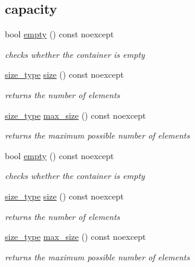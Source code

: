 \subsection*{capacity}
\begin{DoxyCompactItemize}
\item 
bool \hyperlink{classnlohmann_1_1basic__json_ae3fe0423252e171973cdd5786d036e30}{empty} () const noexcept
\begin{DoxyCompactList}\small\item\em checks whether the container is empty \end{DoxyCompactList}\item 
\hyperlink{classnlohmann_1_1basic__json_a1579a8f72a230358d6cd1a6e8a62859b}{size\-\_\-type} \hyperlink{classnlohmann_1_1basic__json_a0ea8a1ecca4b3cb0ba09ad7552c364b6}{size} () const noexcept
\begin{DoxyCompactList}\small\item\em returns the number of elements \end{DoxyCompactList}\item 
\hyperlink{classnlohmann_1_1basic__json_a1579a8f72a230358d6cd1a6e8a62859b}{size\-\_\-type} \hyperlink{classnlohmann_1_1basic__json_a7936417b875b7ec737f77ef84bbf7871}{max\-\_\-size} () const noexcept
\begin{DoxyCompactList}\small\item\em returns the maximum possible number of elements \end{DoxyCompactList}\item 
bool \hyperlink{classnlohmann_1_1basic__json_ae3fe0423252e171973cdd5786d036e30}{empty} () const noexcept
\begin{DoxyCompactList}\small\item\em checks whether the container is empty \end{DoxyCompactList}\item 
\hyperlink{classnlohmann_1_1basic__json_a1579a8f72a230358d6cd1a6e8a62859b}{size\-\_\-type} \hyperlink{classnlohmann_1_1basic__json_a0ea8a1ecca4b3cb0ba09ad7552c364b6}{size} () const noexcept
\begin{DoxyCompactList}\small\item\em returns the number of elements \end{DoxyCompactList}\item 
\hyperlink{classnlohmann_1_1basic__json_a1579a8f72a230358d6cd1a6e8a62859b}{size\-\_\-type} \hyperlink{classnlohmann_1_1basic__json_a7936417b875b7ec737f77ef84bbf7871}{max\-\_\-size} () const noexcept
\begin{DoxyCompactList}\small\item\em returns the maximum possible number of elements \end{DoxyCompactList}\end{DoxyCompactItemize}
